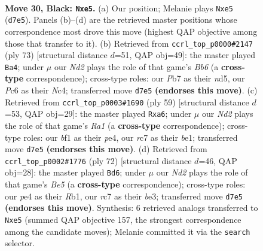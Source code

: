 \documentclass[11pt]{article}
\begin{document}
\clearpage

\begin{figure}[p]\centering
\begin{subfigure}{0.46\textwidth}\centering
\resizebox{\linewidth}{!}{%
\newchessgame
\chessboard[
  setfen={8/1pRn1pk1/p1p5/P3P1p1/1PN1P1b1/8/8/b3KB2 b - - 1 30},
  showmover=false,
  pgfstyle=straightmove, color=movearrow, markmove={d7-e5}
]}
\caption{}
\end{subfigure}\hfill
\begin{subfigure}{0.46\textwidth}\centering
\resizebox{\linewidth}{!}{%
\newchessgame
\chessboard[
  setfen={8/3r1pk1/6pp/1p1N2P1/2n1B2P/PbR2P2/5K2/8 b - - 9 37},
  showmover=false,
  pgfstyle=straightmove, color=movearrow, markmove={b3-a4}
]}
\caption{}
\end{subfigure}
\\[4pt]
\begin{subfigure}{0.46\textwidth}\centering
\resizebox{\linewidth}{!}{%
\newchessgame
\chessboard[
  setfen={r5k1/5pp1/R7/2N1p2p/4Pb1P/2P2P2/2Pn1K2/4B3 b - - 0 30},
  showmover=false,
  pgfstyle=straightmove, color=movearrow, markmove={a8-a6}
]}
\caption{}
\end{subfigure}\hfill
\begin{subfigure}{0.46\textwidth}\centering
\resizebox{\linewidth}{!}{%
\newchessgame
\chessboard[
  setfen={6k1/1p4p1/4pp2/1NPnB3/r2P2PP/4bK2/8/1R6 w - - 0 37},
  showmover=false,
  pgfstyle=straightmove, color=movearrow, markmove={e5-d6}
]}
\caption{}
\end{subfigure}
\caption{\textbf{Move 30, Black: \texttt{Nxe5}.} (a) Our position; Melanie plays \texttt{Nxe5} (\texttt{d7e5}). Panels (b)--(d) are the retrieved master positions whose correspondence most drove this move (highest QAP objective among those that transfer to it). (b) Retrieved from \texttt{ccrl\_top\_p0000\#2147} (ply 73) [structural distance $d$=51, QAP obj=49]: the master played \texttt{Ba4}; under $\mu$ our \emph{Nd2} plays the role of that game's \emph{Bb6} (a \textbf{cross-type} correspondence); cross-type roles: our \emph{P}b7 as their \emph{n}d5, our \emph{P}c6 as their \emph{N}c4; transferred move \texttt{d7e5} \textbf{(endorses this move)}. (c) Retrieved from \texttt{ccrl\_top\_p0003\#1690} (ply 59) [structural distance $d$=53, QAP obj=29]: the master played \texttt{Rxa6}; under $\mu$ our \emph{Nd2} plays the role of that game's \emph{Ra1} (a \textbf{cross-type} correspondence); cross-type roles: our \emph{b}f1 as their \emph{p}e4, our \emph{r}c7 as their \emph{b}e1; transferred move \texttt{d7e5} \textbf{(endorses this move)}. (d) Retrieved from \texttt{ccrl\_top\_p0002\#1776} (ply 72) [structural distance $d$=46, QAP obj=28]: the master played \texttt{Bd6}; under $\mu$ our \emph{Nd2} plays the role of that game's \emph{Be5} (a \textbf{cross-type} correspondence); cross-type roles: our \emph{p}e4 as their \emph{R}b1, our \emph{r}c7 as their \emph{b}e3; transferred move \texttt{d7e5} \textbf{(endorses this move)}. Synthesis: 6 retrieved analogs transferred to \texttt{Nxe5} (summed QAP objective 157, the strongest correspondence among the candidate moves); Melanie committed it via the \texttt{search} selector.}
\label{fig:thought-m59}
\end{figure}
\end{document}
